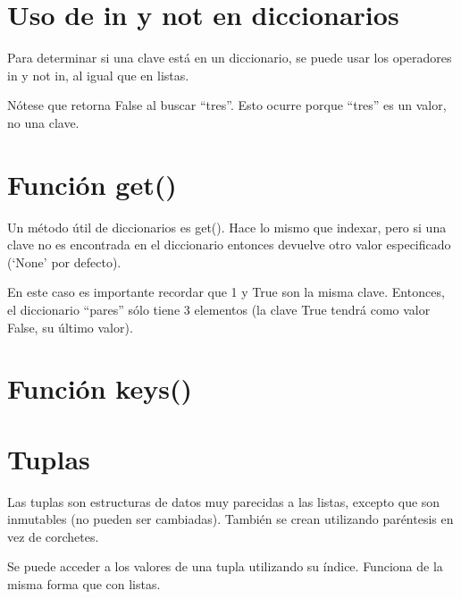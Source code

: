 \documentclass{report}
\newcommand{\simple}[1]{`#1'}
\newcommand{\doble}[1]{``#1''}
\begin{document}
{

\section{Uso de in y not en diccionarios}

Para determinar si una clave está en un diccionario, se puede usar los operadores in y not in, al igual que en listas.


Nótese que retorna False al buscar \doble{tres}. Esto ocurre porque \doble{tres} es un valor, no una clave.

\section{Función get()}

Un método útil de diccionarios es get(). Hace lo mismo que indexar, pero si una clave no es encontrada en el diccionario entonces devuelve otro valor especificado (\simple{None} por defecto).


En este caso es importante recordar que 1 y True son la misma clave. Entonces, el diccionario \doble{pares} sólo tiene 3 elementos (la clave True tendrá como valor False, su último valor).


\section{Función keys()}

\section{Tuplas}

Las tuplas son estructuras de datos muy parecidas a las listas, excepto que son inmutables (no pueden ser cambiadas). También se crean utilizando paréntesis en vez de corchetes.



Se puede acceder a los valores de una tupla utilizando su índice. Funciona de la misma forma que con listas.


}
\end{document}
